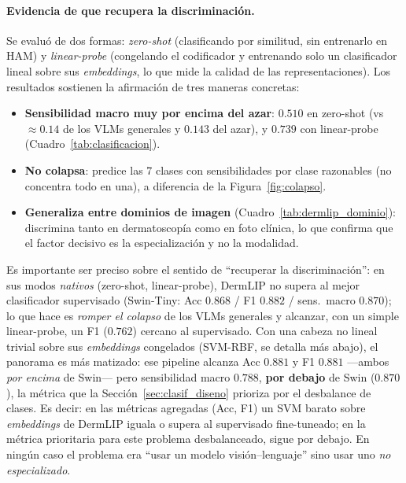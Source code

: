 \documentclass[11pt, a4paper]{article}
\begin{document}
\paragraph{Evidencia de que recupera la discriminación.} Se evaluó de dos formas: \emph{zero-shot}
(clasificando por similitud, sin entrenarlo en HAM) y \emph{linear-probe} (congelando el codificador y
entrenando solo un clasificador lineal sobre sus \emph{embeddings}, lo que mide la calidad de las
representaciones). Los resultados sostienen la afirmación de tres maneras concretas:
\begin{itemize}[leftmargin=1.6em]
  \item \textbf{Sensibilidad macro muy por encima del azar}: $0.510$ en zero-shot (vs $\approx 0.14$ de
  los VLMs generales y $0.143$ del azar), y $0.739$ con linear-probe (Cuadro~\ref{tab:clasificacion}).
  \item \textbf{No colapsa}: predice las 7 clases con sensibilidades por clase razonables (no concentra
  todo en una), a diferencia de la Figura~\ref{fig:colapso}.
  \item \textbf{Generaliza entre dominios de imagen} (Cuadro~\ref{tab:dermlip_dominio}): discrimina
  tanto en dermatoscopía como en foto clínica, lo que confirma que el factor decisivo es la
  especialización y no la modalidad.
\end{itemize}
Es importante ser preciso sobre el sentido de ``recuperar la discriminación'': en sus modos
\emph{nativos} (zero-shot, linear-probe), DermLIP no supera al mejor clasificador supervisado
(Swin-Tiny: Acc $0.868$ / F1 $0.882$ / sens.\ macro $0.870$); lo que hace es \emph{romper el colapso} de
los VLMs generales y alcanzar, con un simple linear-probe, un F1 ($0.762$) cercano al supervisado. Con
una cabeza no lineal trivial sobre sus \emph{embeddings} congelados (SVM-RBF, se detalla más abajo), el
panorama es más matizado: ese pipeline alcanza Acc $0.881$ y F1 $0.881$ —ambos \emph{por encima} de
Swin— pero sensibilidad macro $0.788$, \textbf{por debajo} de Swin ($0.870$), la métrica que la
Sección~\ref{sec:clasif_diseno} prioriza por el desbalance de clases. Es decir: en las métricas
agregadas (Acc, F1) un SVM barato sobre \emph{embeddings} de DermLIP iguala o supera al supervisado
fine-tuneado; en la métrica prioritaria para este problema desbalanceado, sigue por debajo. En ningún
caso el problema era ``usar un modelo visión--lenguaje'' sino usar uno \emph{no especializado}.
\end{document}
